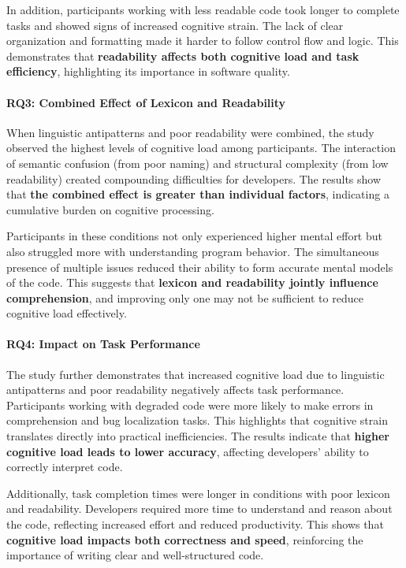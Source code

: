 In addition, participants working with less readable code took longer to complete tasks and showed signs of increased cognitive strain. The lack of clear organization and formatting made it harder to follow control flow and logic. This demonstrates that \textbf{readability affects both cognitive load and task efficiency}, highlighting its importance in software quality.



\paragraph{RQ3: Combined Effect of Lexicon and Readability}
When linguistic antipatterns and poor readability were combined, the study observed the highest levels of cognitive load among participants. The interaction of semantic confusion (from poor naming) and structural complexity (from low readability) created compounding difficulties for developers. The results show that \textbf{the combined effect is greater than individual factors}, indicating a cumulative burden on cognitive processing.

Participants in these conditions not only experienced higher mental effort but also struggled more with understanding program behavior. The simultaneous presence of multiple issues reduced their ability to form accurate mental models of the code. This suggests that \textbf{lexicon and readability jointly influence comprehension}, and improving only one may not be sufficient to reduce cognitive load effectively.


\paragraph{RQ4: Impact on Task Performance}
The study further demonstrates that increased cognitive load due to linguistic antipatterns and poor readability negatively affects task performance. Participants working with degraded code were more likely to make errors in comprehension and bug localization tasks. This highlights that cognitive strain translates directly into practical inefficiencies. The results indicate that \textbf{higher cognitive load leads to lower accuracy}, affecting developers' ability to correctly interpret code.

Additionally, task completion times were longer in conditions with poor lexicon and readability. Developers required more time to understand and reason about the code, reflecting increased effort and reduced productivity. This shows that \textbf{cognitive load impacts both correctness and speed}, reinforcing the importance of writing clear and well-structured code.


